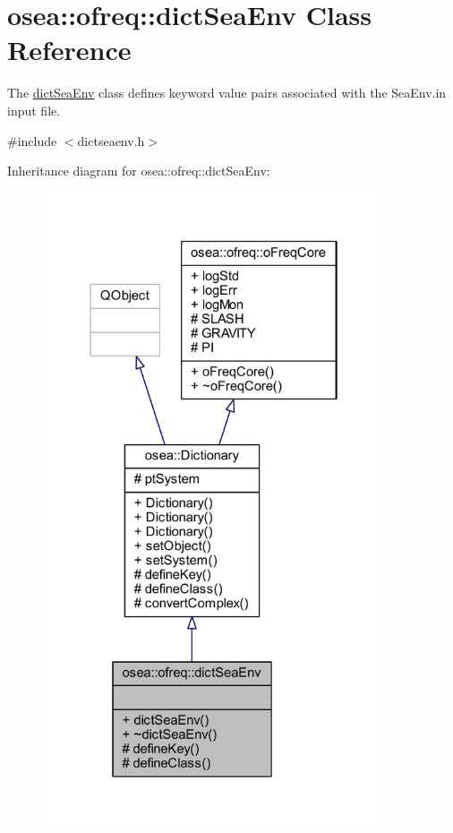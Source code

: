 \hypertarget{classosea_1_1ofreq_1_1dict_sea_env}{\section{osea\-:\-:ofreq\-:\-:dict\-Sea\-Env Class Reference}
\label{classosea_1_1ofreq_1_1dict_sea_env}
}


The \hyperlink{classosea_1_1ofreq_1_1dict_sea_env}{dict\-Sea\-Env} class defines keyword value pairs associated with the Sea\-Env.\-in input file.  




{\ttfamily \#include $<$dictseaenv.\-h$>$}



Inheritance diagram for osea\-:\-:ofreq\-:\-:dict\-Sea\-Env\-:
\nopagebreak
\begin{figure}[H]
\begin{center}
\leavevmode
\includegraphics[width=286pt]{classosea_1_1ofreq_1_1dict_sea_env__inherit__graph}
\end{center}
\end{figure}
